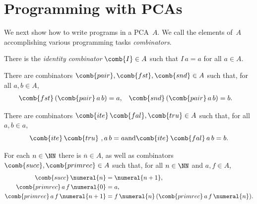 \section{Programming with PCAs}

We next show how to write programs in a PCA~$A$.
We call the elements of~$A$ accomplishing various programming tasks \emph{combinators}.

\begin{definition}[Identity]
  \label{def:combinator-I}
  \leanok
  There is the \emph{identity combinator} $\comb{I} \in A$ such that $I \, a = a$ for all $a \in A$.
\end{definition}

\begin{definition}[Pairing]
  \label{def:combinator-pairing}
  \leanok
  There are combinators $\comb{pair}, \comb{fst}, \comb{snd} \in A$ such that, for all $a, b \in A$,
  \begin{align*}
    \comb{fst}\, (\comb{pair}\,a\,b) &= a,
    &
    \comb{snd}\, (\comb{pair}\,a\,b) &= b.
  \end{align*}
\end{definition}

\begin{definition}[Booleans]
  \label{def:combinator-bool}
  \leanok
  There are combinators $\comb{ite} \, \comb{fal}, \comb{tru} \in A$ such that, for all $a, b \in a$,
  \begin{equation*}
    \comb{ite} \, \comb{tru} \ ,a \, b = a
    \text{and}
    \comb{ite} \, \comb{fal} \, a \, b = b.
  \end{equation*}
\end{definition}

\begin{definition}[Numerals]
  \label{def:combinator-nat}
  \leanok
  For each $n \in \NN$ there is $\overline{n} \in A$, as well as combinators $\comb{succ}, \comb{primrec} \in A$
  such that, for all $n \in \NN$ and $a, f \in A$,
  \begin{align*}
    \comb{succ} \, \numeral{n} &= \numeral{n+1},
    \\
    \comb{primrec} \, a \, f \, \numeral{0} &= a,
    \\
    \comb{primrec} \, a \, f \, \numeral{n+1} &= f \, \numeral{n} \, (\comb{primrec} \, a \, f \, \numeral{n}).
  \end{align*}
\end{definition}

